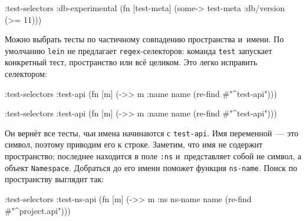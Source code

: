 \else

\begin{english}
  \begin{clojure}
:test-selectors {:db-experimental
                 (fn [test-meta]
                   (some-> test-meta :db/version (>= 11)))}
  \end{clojure}
\end{english}

\fi

Можно выбрать тесты по частичному совпадению пространства и~имени. По умолчанию
\verb|lein| не предлагает \verb|regex|-селекторов: команда \verb|test| запускает
конкретный тест, пространство или всё целиком. Это легко исправить селектором:

\ifx\devicetype\mobile

\begin{english}
  \begin{clojure}
:test-selectors
  {:test-api
   (fn [m]
     (->> m :name name
          (re-find #"^test-api")))}
  \end{clojure}
\end{english}

\else

\begin{english}
  \begin{clojure}
:test-selectors {:test-api
                 (fn [m] (->> m :name name
                              (re-find #"^test-api")))}
  \end{clojure}
\end{english}

\fi

Он вернёт все тесты, чьи имена начинаются с \verb|test-api|. Имя переменной~--- это
символ, поэтому приводим его к строке. Заметим, что имя не содержит
пространство; последнее находится в поле \verb|:ns| и~представляет собой не
символ, а объект \verb|Namespace|. Добраться до его имени поможет функция
\verb|ns-name|. Поиск по пространству выглядит так:


\ifx\devicetype\mobile

\begin{english}
  \begin{clojure}
:test-selectors
  {:test-ns-api
   (fn [m]
     (->> m :ns ns-name name
          (re-find #"^project.api")))}
  \end{clojure}
\end{english}

